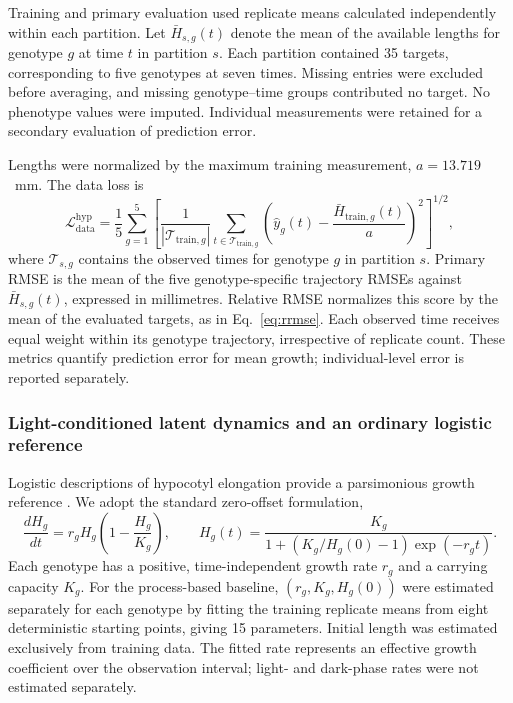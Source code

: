 Training and primary evaluation used replicate means calculated independently within each partition. Let $\bar H_{s,g}(t)$ denote the mean of the available lengths for genotype $g$ at time $t$ in partition $s$. Each partition contained 35 targets, corresponding to five genotypes at seven times. Missing entries were excluded before averaging, and missing genotype--time groups contributed no target. No phenotype values were imputed. Individual measurements were retained for a secondary evaluation of prediction error.

Lengths were normalized by the maximum training measurement, $a=13.719$~mm. The data loss is
\begin{equation}
 \mathcal L_{\mathrm{data}}^{\mathrm{hyp}}
 =\frac{1}{5}\sum_{g=1}^{5}\left[
 \frac{1}{|\mathcal T_{\mathrm{train},g}|}
 \sum_{t\in\mathcal T_{\mathrm{train},g}}
 \left(\hat y_g(t)-\frac{\bar H_{\mathrm{train},g}(t)}{a}\right)^2
 \right]^{1/2},
 \label{eq:hypocotyl_data_loss}
\end{equation}
where $\mathcal T_{s,g}$ contains the observed times for genotype $g$ in partition $s$. Primary RMSE is the mean of the five genotype-specific trajectory RMSEs against $\bar H_{s,g}(t)$, expressed in millimetres. Relative RMSE normalizes this score by the mean of the evaluated targets, as in Eq.~\eqref{eq:rrmse}. Each observed time receives equal weight within its genotype trajectory, irrespective of replicate count. These metrics quantify prediction error for mean growth; individual-level error is reported separately.

\subsubsection{Light-conditioned latent dynamics and an ordinary logistic reference}
\label{subsec:lightmodel}

Logistic descriptions of hypocotyl elongation provide a parsimonious growth reference \citep{alimchandani2026atlas}. We adopt the standard zero-offset formulation,
\begin{equation}
 \frac{dH_g}{dt}=r_g H_g\left(1-\frac{H_g}{K_g}\right),
 \qquad
 H_g(t)=\frac{K_g}{1+(K_g/H_g(0)-1)\exp(-r_g t)}.
 \label{eq:hypocotyl_logistic}
\end{equation}
Each genotype has a positive, time-independent growth rate $r_g$ and a carrying capacity $K_g$. For the process-based baseline, $(r_g,K_g,H_g(0))$ were estimated separately for each genotype by fitting the training replicate means from eight deterministic starting points, giving 15 parameters. Initial length was estimated exclusively from training data. The fitted rate represents an effective growth coefficient over the observation interval; light- and dark-phase rates were not estimated separately.

